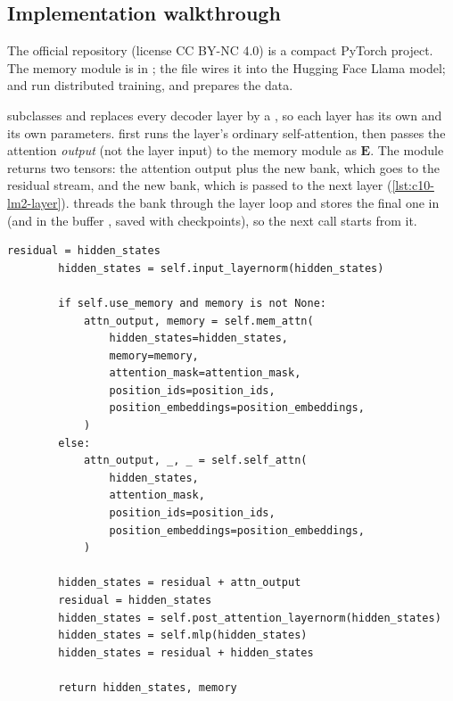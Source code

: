 \subsection{Implementation walkthrough}\label{sec:c10-lm2-code}

The official repository  (license CC BY-NC 4.0) is a compact PyTorch
project. The memory module is in ;
the file  wires it into the Hugging
Face Llama model;
 and
 run distributed training, and
 prepares the data.

\begin{implnote}[title={In the code: wiring into each decoder layer}]
 subclasses  and replaces every decoder layer by a
, so each layer has its own  and its own
 parameters.  first runs the layer's ordinary
self-attention, then passes the attention \emph{output} (not the layer input) to the memory module
as $\bm{E}$. The module returns two tensors: the attention output plus the new bank, which goes to
the residual stream, and the new bank, which is passed to the next layer
(\cref{lst:c10-lm2-layer}).  threads the bank through the layer loop and
stores the final one in  (and in the buffer , saved with
checkpoints), so the next call starts from it.
\end{implnote}

\begin{lstlisting}[caption={Excerpt from \texttt{repos/convergence-ai\_\_lm2/src/model\_memory\_llama.py} (\texttt{CustomLlamaDecoderLayer.forward}).},label={lst:c10-lm2-layer}]
        residual = hidden_states
        hidden_states = self.input_layernorm(hidden_states)

        if self.use_memory and memory is not None:
            attn_output, memory = self.mem_attn(
                hidden_states=hidden_states,
                memory=memory,
                attention_mask=attention_mask,
                position_ids=position_ids,
                position_embeddings=position_embeddings,
            )
        else:
            attn_output, _, _ = self.self_attn(
                hidden_states,
                attention_mask,
                position_ids=position_ids,
                position_embeddings=position_embeddings,
            )

        hidden_states = residual + attn_output
        residual = hidden_states
        hidden_states = self.post_attention_layernorm(hidden_states)
        hidden_states = self.mlp(hidden_states)
        hidden_states = residual + hidden_states

        return hidden_states, memory
\end{lstlisting}

